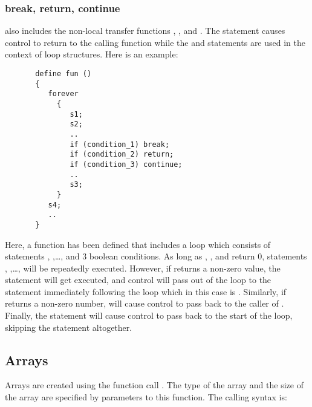 \subsubsection{break, return, continue}

   \slang{} also includes the non-local transfer functions , ,
   and .  The  statement causes control to return to the
   calling function while the  and  statements are used in
   the context of loop structures.  Here is an example:

\begin{verbatim}
       define fun ()
       {
          forever 
            {
               s1;
               s2;
               ..
               if (condition_1) break;
               if (condition_2) return;
               if (condition_3) continue;
               ..
               s3;
            }
          s4;
          ..
       }
\end{verbatim}
   Here, a function  has been defined that includes a 
   loop which consists of statements , ,\ldots, and
   $3$ boolean conditions.  As long as ,
   , and  return $0$, statements
   , ,\ldots, will be repeatedly executed.  However,
   if  returns a non-zero value, the  statement
   will get executed, and control will pass out of the  loop to
   the statement immediately following the loop which in this case is
   . Similarly, if  returns a non-zero number,
    will cause control to pass back to the caller of .
   Finally, the  statement will cause control to pass back to the
   start of the loop, skipping the statement  altogether.

\subsection{Arrays}


   Arrays are created using the function call .  The type of
   the array and the size of the array are specified by parameters to this
   function.  The calling syntax is:
   

